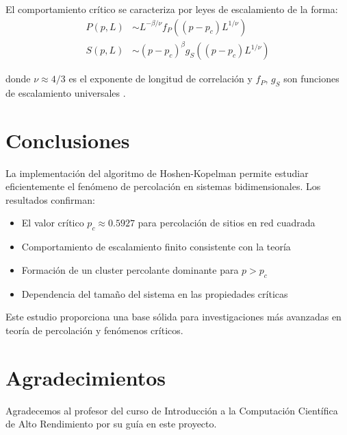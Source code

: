 \documentclass[11pt,a4paper]{article}
\begin{document}
El comportamiento crítico se caracteriza por leyes de escalamiento de la forma:
\begin{align}
P(p,L) &\sim L^{-\beta/\nu} f_P\left((p-p_c)L^{1/\nu}\right) \\
S(p,L) &\sim (p-p_c)^{\beta} g_S\left((p-p_c)L^{1/\nu}\right)
\end{align}

donde $\nu \approx 4/3$ es el exponente de longitud de correlación y $f_P$, $g_S$ son funciones de escalamiento universales \cite{cardy1992scaling}.

\section{Conclusiones}

La implementación del algoritmo de Hoshen-Kopelman permite estudiar eficientemente el fenómeno de percolación en sistemas bidimensionales. Los resultados confirman:

\begin{itemize}
    \item El valor crítico $p_c \approx 0.5927$ para percolación de sitios en red cuadrada
    \item Comportamiento de escalamiento finito consistente con la teoría
    \item Formación de un cluster percolante dominante para $p > p_c$
    \item Dependencia del tamaño del sistema en las propiedades críticas
\end{itemize}

Este estudio proporciona una base sólida para investigaciones más avanzadas en teoría de percolación y fenómenos críticos.

\section{Agradecimientos}

Agradecemos al profesor del curso de Introducción a la Computación Científica de Alto Rendimiento por su guía en este proyecto.



\end{document}
